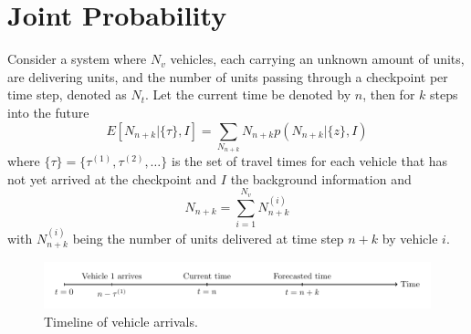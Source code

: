 \section{Joint Probability}
Consider a system where $N_v$ vehicles, each carrying an unknown amount of units, are delivering units, and the number of units passing through a checkpoint per time step, denoted as $N_t$. Let the current time be denoted by $n$, then for $k$ steps into the future
\begin{equation}
	E[N_{n+k} |\{\tau\},I] = \sum_{N_{n+k}}N_{n+k}p(N_{n+k}|\{z\},I)
	\label{eq:E}	
\end{equation}
where $\{\tau\} = \{\tau^{(1)},\tau^{(2)},\dots\}$ is the set of travel times for each vehicle that has not yet arrived at the checkpoint and $I$ the background information and
\begin{equation}
	N_{n+k} = \sum_{i=1}^{N_v}N_{n+k}^{(i)}
	\label{eq:N}
\end{equation} 
with $N_{n+k}^{(i)}$ being the number of units delivered at time step $n+k$ by vehicle $i$. 
\begin{figure}[H]
	\centering
	\includegraphics[width = 1\textwidth]{figures/vehicle_timeline.pdf}
	\caption{Timeline of vehicle arrivals.}
	\label{fig:vehicle_arrivals}
\end{figure}


